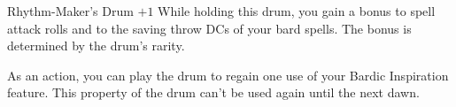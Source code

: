 \documentclass{dnd-deck}
\begin{document}
\begin{Card}{Rhythm-Maker's Drum $+1$}
  While holding this drum, you gain a bonus to spell attack rolls and to
  the saving throw DCs of your bard spells. The bonus is determined by
  the drum's rarity.

  As an action, you can play the drum to regain one use of your Bardic
  Inspiration feature. This property of the drum can't be used again
  until the next dawn.
\end{Card}

\SpellCards

\Placard
\end{document}
